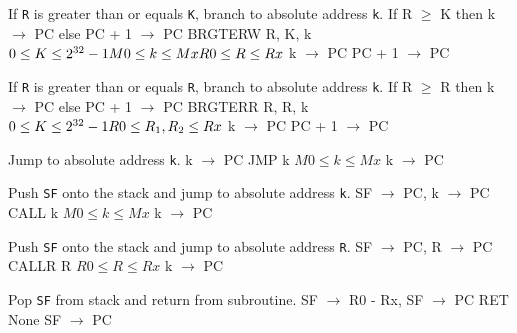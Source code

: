 \documentclass[titlepage]{scrartcl}
\begin{document}
{If \texttt{R} is greater than or equals \texttt{K}, branch to absolute address \texttt{k}.}
{If R $\geq$ K then k $\rightarrow$ PC else PC + 1 $\rightarrow$ PC}
{BRGTERW R, K, k}
{$0 \leq K \leq 2^{32} - 1 \hfill \break M0 \leq k \leq Mx \hfill \break R0 \leq R \leq Rx$}
{k $\rightarrow$ PC \hfill \break PC + 1 $\rightarrow$ PC}
{}
{\srtable{}{}{}{}}

{If \texttt{R} is greater than or equals \texttt{R}, branch to absolute address \texttt{k}.}
{If R $\geq$ R then k $\rightarrow$ PC else PC + 1 $\rightarrow$ PC}
{BRGTERR R, R, k}
{$0 \leq K \leq 2^{32} - 1 \hfill \break R0 \leq R_{1}, R_{2} \leq Rx$}
{k $\rightarrow$ PC \hfill \break PC + 1 $\rightarrow$ PC}
{}
{\srtable{}{}{}{}}

{Jump to absolute address \texttt{k}.}
{k $\rightarrow$ PC}
{JMP k}
{$M0 \leq k \leq Mx$}
{k $\rightarrow$ PC}
{}
{\srtable{}{}{}{}}

{Push \texttt{SF} onto the stack and jump to absolute address \texttt{k}.}
{SF $\rightarrow$ PC, k $\rightarrow$ PC}
{CALL k}
{$M0 \leq k \leq Mx$}
{k $\rightarrow$ PC}
{}
{\srtable{}{}{}{}}

{Push \texttt{SF} onto the stack and jump to absolute address \texttt{R}.}
{SF $\rightarrow$ PC, R $\rightarrow$ PC}
{CALLR R}
{$R0 \leq R \leq Rx$}
{k $\rightarrow$ PC}
{}
{\srtable{}{}{}{}}

{Pop \texttt{SF} from stack and return from subroutine.}
{SF $\rightarrow$ R0 - Rx, SF $\rightarrow$ PC}
{RET}
{None}
{SF $\rightarrow$ PC}
{}
{\srtable{}{}{}{}}

\end{document}
